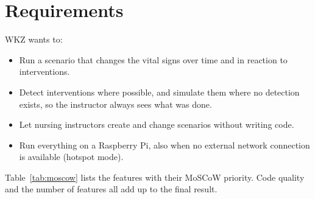 \documentclass[11pt,a4paper]{article}
\begin{document}
\section{Requirements}
WKZ wants to:
\begin{itemize}
  \item Run a scenario that changes the vital signs over time and in reaction
        to interventions.
  \item Detect interventions where possible, and simulate them where no
        detection exists, so the instructor always sees what was done.
  \item Let nursing instructors create and change scenarios without writing code.
  \item Run everything on a Raspberry Pi, also when no external network
        connection is available (hotspot mode).
\end{itemize}

Table~\ref{tab:moscow} lists the features with their MoSCoW priority.
Code quality and the number of features all add up to the final result.
\end{document}
